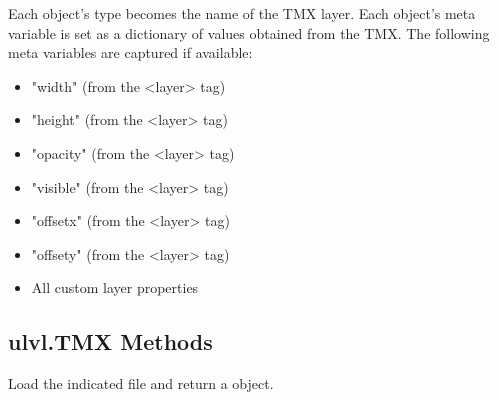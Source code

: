 \documentclass[letterpaper,10pt,english]{sphinxmanual}
\begin{document}
\begin{fulllineitems}
\begin{fulllineitems}
Each {\hyperref[\detokenize{index:ulvl.TileLayer}]{}} object's type becomes the name of the TMX
layer.  Each {\hyperref[\detokenize{index:ulvl.TileLayer}]{}} object's meta variable is set as
a dictionary of values obtained from the TMX.  The following meta
variables are captured if available:
\begin{itemize}
\item {} 
"width" (from the \textless{}layer\textgreater{} tag)

\item {} 
"height" (from the \textless{}layer\textgreater{} tag)

\item {} 
"opacity" (from the \textless{}layer\textgreater{} tag)

\item {} 
"visible" (from the \textless{}layer\textgreater{} tag)

\item {} 
"offsetx" (from the \textless{}layer\textgreater{} tag)

\item {} 
"offsety" (from the \textless{}layer\textgreater{} tag)

\item {} 
All custom layer properties

\end{itemize}

\end{fulllineitems}


\end{fulllineitems}



\subsection{ulvl.TMX Methods}
\label{\detokenize{index:ulvl-tmx-methods}}

\begin{fulllineitems}
\label{\detokenize{index:ulvl.TMX.load}}
Load the indicated file and return a {\hyperref[\detokenize{index:ulvl.TMX}]{}} object.

\end{fulllineitems}
\end{document}
